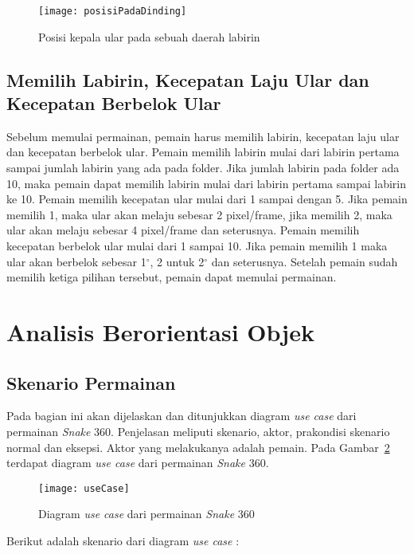 \begin{figure}[H]
	\centering  
	\texttt{[image: posisiPadaDinding]}  
	\caption[Posisi kepala ular pada sebuah daerah labirin]{Posisi kepala ular pada sebuah daerah labirin}
	\label{fig:posisiPadaDinding} 
\end{figure}

\subsection{Memilih Labirin, Kecepatan Laju Ular dan Kecepatan Berbelok Ular}
Sebelum memulai permainan, pemain harus memilih labirin, kecepatan laju ular dan kecepatan berbelok ular. Pemain memilih labirin mulai dari labirin pertama sampai jumlah labirin yang ada pada folder. Jika jumlah labirin pada folder ada 10, maka pemain dapat memilih labirin mulai dari labirin pertama sampai labirin ke 10. Pemain memilih kecepatan ular mulai dari 1 sampai dengan 5. Jika pemain memilih 1, maka ular akan melaju sebesar 2 pixel/frame, jika memilih 2, maka ular akan melaju sebesar 4 pixel/frame dan seterusnya. Pemain memilih kecepatan berbelok ular mulai dari 1 sampai 10. Jika pemain memilih 1 maka ular akan berbelok sebesar 1$^\circ$, 2 untuk 2$^\circ$ dan seterusnya. Setelah pemain sudah memilih ketiga pilihan tersebut, pemain dapat memulai permainan.

\section{Analisis Berorientasi Objek}

\subsection{Skenario Permainan}
Pada bagian ini akan dijelaskan dan ditunjukkan diagram \textit{use case} dari permainan \textit{Snake} 360. Penjelasan meliputi skenario, aktor, prakondisi skenario normal dan eksepsi. Aktor yang melakukanya adalah pemain. Pada Gambar~\ref{fig:useCase} terdapat diagram \textit{use case} dari permainan \textit{Snake} 360.

\begin{figure}[H]
	\centering  
	\texttt{[image: useCase]}  
	\caption[Diagram \textit{use case} dari permainan \textit{Snake} 360]{Diagram \textit{use case} dari permainan \textit{Snake} 360}
	\label{fig:useCase} 
\end{figure}

Berikut adalah skenario dari diagram \textit{use case} :


